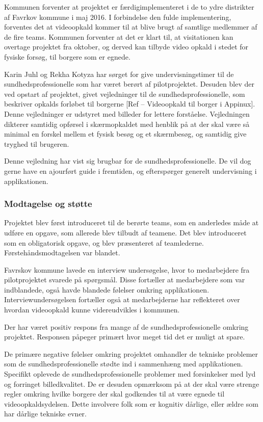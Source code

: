 Kommunen forventer at projektet er færdigimplementeret i de to ydre distrikter af Favrkov kommune i maj 2016. I forbindelse den fulde implementering, forventes det at videoopkald kommer til at blive brugt af samtlige medlemmer af de fire teams. Kommunen forventer at det er klart til, at visitationen kan overtage projektet fra oktober, og derved kan tilbyde video opkald i stedet for fysiske forsøg, til borgere som er egnede.

Karin Juhl og Rekha Kotyza har sørget for give undervisningstimer til de sundhedsprofessionelle som har været berørt af pilotprojektet. Desuden blev der ved opstart af projektet, givet vejledninger til de sundhedsprofessionelle, som beskriver opkalds forløbet til borgerne [Ref – Videoopkald til borger i Appinux]. Denne vejledninger er udstyret med billeder for lettere forståelse. Vejledningen dikterer samtidig opførsel i skærmopkaldet med henblik på at der skal være så minimal en forskel mellem et fysisk besøg og et skærmbesøg, og samtidig give tryghed til brugeren.

Denne vejledning har vist sig brugbar for de sundhedsprofessionelle. De vil dog gerne have en ajourført guide i fremtiden, og efterspørger generelt undervisning i applikationen.

 
\subsubsection{Modtagelse og støtte}
Projektet blev først introduceret til de berørte teams, som en anderledes måde at udføre en opgave, som allerede blev tilbudt af teamene. Det blev introduceret som en obligatorisk opgave, og blev præsenteret af teamlederne. Førstehåndsmodtagelsen var blandet. 

Favrskov kommune lavede en interview undersøgelse, hvor to medarbejdere fra pilotprojektet svarede på spørgsmål. Disse fortæller at medarbejdere som var indblandede, også havde blandede følelser omkring applikationen. Interviewundersøgelsen fortæller også at medarbejderne har reflekteret over hvordan videoopkald kunne videreudvikles i kommunen. 

Der har været positiv respons fra mange af de sundhedsprofessionelle omkring projektet. Responsen påpeger primært hvor meget tid det er muligt at spare.

De primære negative følelser omkring projektet omhandler de tekniske problemer som de sundhedsprofessionelle stødte ind i sammenhæng med applikationen. Specifikt oplevede de sundhedsprofessionelle problemer med forsinkelser med lyd og forringet billedkvalitet. De er desuden opmærksom på at der skal være strenge regler omkring hvilke borgere der skal godkendes til at være egnede til videoopkaldsydelsen. Dette involvere folk som er kognitiv dårlige, eller ældre som har dårlige tekniske evner. 

